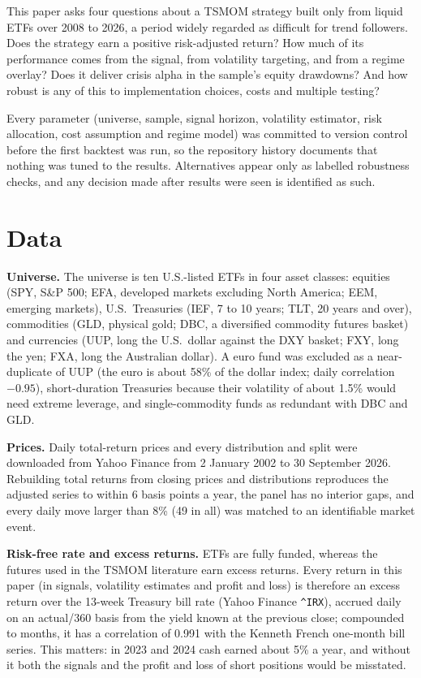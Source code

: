 \documentclass[11pt,a4paper]{article}
\begin{document}
This paper asks four questions about a TSMOM strategy built only from liquid ETFs over 2008 to 2026, a period widely regarded as difficult for trend followers. Does the strategy earn a positive risk-adjusted return? How much of its performance comes from the signal, from volatility targeting, and from a regime overlay? Does it deliver crisis alpha in the sample's equity drawdowns? And how robust is any of this to implementation choices, costs and multiple testing?

Every parameter (universe, sample, signal horizon, volatility estimator, risk allocation, cost assumption and regime model) was committed to version control before the first backtest was run, so the repository history documents that nothing was tuned to the results. Alternatives appear only as labelled robustness checks, and any decision made after results were seen is identified as such.

\section{Data}
\label{sec:data}

\textbf{Universe.} The universe is ten U.S.-listed ETFs in four asset classes: equities (SPY, S\&P 500; EFA, developed markets excluding North America; EEM, emerging markets), U.S.\ Treasuries (IEF, 7 to 10 years; TLT, 20 years and over), commodities (GLD, physical gold; DBC, a diversified commodity futures basket) and currencies (UUP, long the U.S.\ dollar against the DXY basket; FXY, long the yen; FXA, long the Australian dollar). A euro fund was excluded as a near-duplicate of UUP (the euro is about 58\% of the dollar index; daily correlation $-0.95$), short-duration Treasuries because their volatility of about 1.5\% would need extreme leverage, and single-commodity funds as redundant with DBC and GLD.

\textbf{Prices.} Daily total-return prices and every distribution and split were downloaded from Yahoo Finance from 2 January 2002 to 30 September 2026. Rebuilding total returns from closing prices and distributions reproduces the adjusted series to within 6 basis points a year, the panel has no interior gaps, and every daily move larger than 8\% (49 in all) was matched to an identifiable market event.

\textbf{Risk-free rate and excess returns.} ETFs are fully funded, whereas the futures used in the TSMOM literature earn excess returns. Every return in this paper (in signals, volatility estimates and profit and loss) is therefore an excess return over the 13-week Treasury bill rate (Yahoo Finance \texttt{\^{}IRX}), accrued daily on an actual/360 basis from the yield known at the previous close; compounded to months, it has a correlation of 0.991 with the Kenneth French one-month bill series. This matters: in 2023 and 2024 cash earned about 5\% a year, and without it both the signals and the profit and loss of short positions would be misstated.
\end{document}
